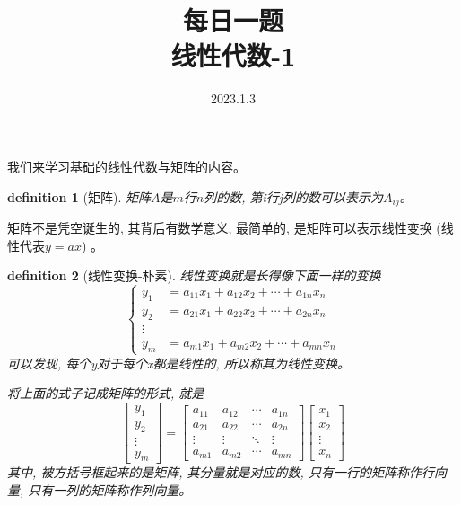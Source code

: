 \documentclass{ctexart}
\title{每日一题\\{\small 线性代数-1}}
\date{2023.1.3}
\newtheorem{definition}{definition}
\begin{document}
    \maketitle {}

    我们来学习基础的线性代数与矩阵的内容。

    \begin{definition}
        [矩阵] 矩阵\(A\)是\(m\)行\(n\)列的数, 第i行j列的数可以表示为\(A_{ij}\)。
    \end{definition}

    矩阵不是凭空诞生的, 其背后有数学意义, 最简单的, 是矩阵可以表示线性变换 (线性代表\(y=ax\)) 。

    \begin{definition}
        [线性变换-朴素] 线性变换就是长得像下面一样的变换
        \begin{equation}
            \left \{
            \begin{aligned}
                y_1 &= a_{11}x_1 + a_{12}x_2 + \cdots + a_{1n}x_n \\
                y_2 &= a_{21}x_1 + a_{22}x_2 + \cdots + a_{2n}x_n \\
                \vdots \\
                y_m &= a_{m1}x_1 + a_{m2}x_2 + \cdots + a_{mn}x_n
            \end{aligned}
            \right .
        \end{equation}
        可以发现, 每个y对于每个x都是线性的, 所以称其为线性变换。
        
        将上面的式子记成矩阵的形式, 就是
        \begin{equation}
            \label {eq:线性变换的矩阵表示}
            \begin{bmatrix}
                y_1 \\
                y_2 \\
                \vdots \\
                y_m
            \end{bmatrix} = \begin{bmatrix}
                a_{11} & a_{12} & \cdots & a_{1n} \\
                a_{21} & a_{22} & \cdots & a_{2n} \\
                \vdots & \vdots & \ddots & \vdots \\
                a_{m1} & a_{m2} & \cdots & a_{mn}
            \end{bmatrix} \begin{bmatrix}
                x_1 \\
                x_2 \\
                \vdots \\
                x_n
            \end{bmatrix}
        \end{equation}
        其中, 被方括号框起来的是矩阵, 其分量就是对应的数, 只有一行的矩阵称作行向量, 
        只有一列的矩阵称作列向量。
    \end{definition}
\end{document}
